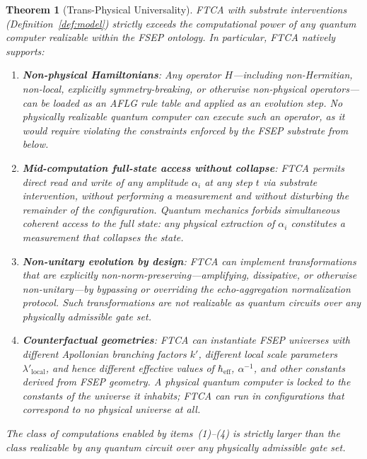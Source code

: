 \documentclass[11pt,letterpaper]{article}
\newtheorem{theorem}{Theorem}
\begin{document}
\begin{theorem}[Trans-Physical Universality]
\label{thm:transphysical}
FTCA with substrate interventions (Definition~\ref{def:model}) strictly exceeds the computational power of any quantum computer realizable within the FSEP ontology. In particular, FTCA natively supports:
\begin{enumerate}
  \item \textbf{Non-physical Hamiltonians}: Any operator $H$---including non-Hermitian, non-local, explicitly symmetry-breaking, or otherwise non-physical operators---can be loaded as an AFLG rule table and applied as an evolution step. No physically realizable quantum computer can execute such an operator, as it would require violating the constraints enforced by the FSEP substrate from below.

  \item \textbf{Mid-computation full-state access without collapse}: FTCA permits direct read and write of any amplitude $\alpha_i$ at any step $t$ via substrate intervention, without performing a measurement and without disturbing the remainder of the configuration. Quantum mechanics forbids simultaneous coherent access to the full state: any physical extraction of $\alpha_i$ constitutes a measurement that collapses the state.

  \item \textbf{Non-unitary evolution by design}: FTCA can implement transformations that are explicitly non-norm-preserving---amplifying, dissipative, or otherwise non-unitary---by bypassing or overriding the echo-aggregation normalization protocol. Such transformations are not realizable as quantum circuits over any physically admissible gate set.

  \item \textbf{Counterfactual geometries}: FTCA can instantiate FSEP universes with different Apollonian branching factors $k'$, different local scale parameters $\lambda'_{\text{local}}$, and hence different effective values of $\hbar_{\text{eff}}$, $\alpha^{-1}$, and other constants derived from FSEP geometry. A physical quantum computer is locked to the constants of the universe it inhabits; FTCA can run in configurations that correspond to no physical universe at all.
\end{enumerate}
The class of computations enabled by items~(1)--(4) is strictly larger than the class realizable by any quantum circuit over any physically admissible gate set.
\end{theorem}
\end{document}
